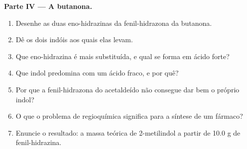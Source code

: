 \begin{problem}
\medskip\noindent\textbf{Parte IV --- A butanona.}
\begin{enumerate}[resume]
  \item Desenhe as duas eno-hidrazinas da fenil-hidrazona da butanona.
  \item Dê os dois indóis aos quais elas levam.
  \item Que eno-hidrazina é mais substituída, e qual se forma em ácido forte?
  \item Que indol predomina com um ácido fraco, e por quê?
  \item Por que a fenil-hidrazona do acetaldeído não consegue dar bem o próprio indol?
  \item O que o problema de regioquímica significa para a síntese de um fármaco?
  \item Enuncie o resultado: a massa teórica de 2-metilindol a partir de 10.0 g de
        fenil-hidrazina.
\end{enumerate}
\end{problem}
